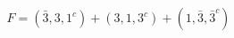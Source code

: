 \begin{equation}
         F=(\bar{3},3,1^{c})+(3,1,3^{c})+(1,\bar{3},\bar{3}^{c})    
\end{equation}

